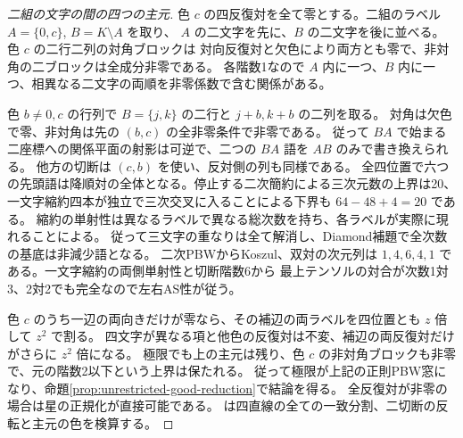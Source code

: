 \begin{proof}[二組の文字の間の四つの主元]
色 $c$ の四反復対を全て零とする。二組のラベル $A=\{0,c\}$, $B=K\setminus A$ を取り、
$A$ の二文字を先に、$B$ の二文字を後に並べる。色 $c$ の二行二列の対角ブロックは
対向反復対と欠色により両方とも零で、非対角の二ブロックは全成分非零である。
各階数1なので $A$ 内に一つ、$B$ 内に一つ、相異なる二文字の両順を非零係数で含む関係がある。

色 $b\ne0,c$ の行列で $B=\{j,k\}$ の二行と $j+b,k+b$ の二列を取る。
対角は欠色で零、非対角は先の $(b,c)$ の全非零条件で非零である。
従って $BA$ で始まる二座標への関係平面の射影は可逆で、二つの $BA$ 語を $AB$ のみで書き換えられる。
他方の切断は $(c,b)$ を使い、反対側の列も同様である。
全四位置で六つの先頭語は降順対の全体となる。停止する二次簡約による三次元数の上界は20、
一文字縮約四本が独立で三次交叉に入ることによる下界も $64-48+4=20$ である。
縮約の単射性は異なるラベルで異なる総次数を持ち、各ラベルが実際に現れることによる。
従って三文字の重なりは全て解消し、Diamond補題で全次数の基底は非減少語となる。
二次PBWからKoszul、双対の次元列は $1,4,6,4,1$ である。一文字縮約の両側単射性と切断階数6から
最上テンソルの対合が次数1対3、2対2でも完全なので左右AS性が従う。

色 $c$ のうち一辺の両向きだけが零なら、その補辺の両ラベルを四位置とも $z$ 倍して $z^2$ で割る。
四文字が異なる項と他色の反復対は不変、補辺の両反復対だけがさらに $z^2$ 倍になる。
極限でも上の主元は残り、色 $c$ の非対角ブロックも非零で、元の階数2以下という上界は保たれる。
従って極限が上記の正則PBW窓になり、命題\ref{prop:unrestricted-good-reduction}で結論を得る。
全反復対が非零の場合は星の正規化が直接可能である。
 は四直線の全ての一致分割、二切断の反転と主元の色を検算する。
\end{proof}

